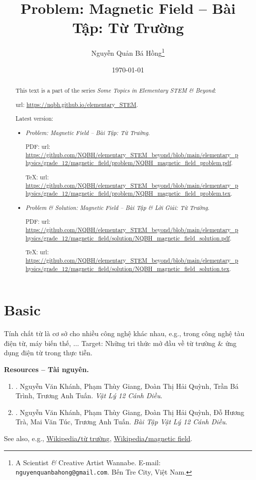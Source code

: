 \documentclass{article}
\title{Problem: Magnetic Field -- Bài Tập: Từ Trường}
\author{Nguyễn Quản Bá Hồng\footnote{A Scientist {\it\&} Creative Artist Wannabe. E-mail: {\tt nguyenquanbahong@gmail.com}. Bến Tre City, Việt Nam.}}
\date{\today}
\begin{document}
\maketitle
\begin{abstract}
	This text is a part of the series {\it Some Topics in Elementary STEM \& Beyond}:
	
	{\sc url}: \url{https://nqbh.github.io/elementary_STEM}.
	
	Latest version:
	\begin{itemize}
		\item {\it Problem: Magnetic Field -- Bài Tập: Từ Trường}.
		
		PDF: {\sc url}: \url{https://github.com/NQBH/elementary_STEM_beyond/blob/main/elementary_physics/grade_12/magnetic_field/problem/NQBH_magnetic_field_problem.pdf}.
		
		\TeX: {\sc url}: \url{https://github.com/NQBH/elementary_STEM_beyond/blob/main/elementary_physics/grade_12/magnetic_field/problem/NQBH_magnetic_field_problem.tex}.
		\item {\it Problem \& Solution: Magnetic Field -- Bài Tập \& Lời Giải: Từ Trường}.
		
		PDF: {\sc url}: \url{https://github.com/NQBH/elementary_STEM_beyond/blob/main/elementary_physics/grade_12/magnetic_field/solution/NQBH_magnetic_field_solution.pdf}.
		
		\TeX: {\sc url}: \url{https://github.com/NQBH/elementary_STEM_beyond/blob/main/elementary_physics/grade_12/magnetic_field/solution/NQBH_magnetic_field_solution.tex}.
	\end{itemize}
\end{abstract}
\tableofcontents


\section{Basic}
Tính chất từ là cơ sở cho nhiều công nghệ khác nhau, e.g., trong công nghệ tàu điện từ, máy biến thế, $\ldots$ Target: Những tri thức mở đầu về từ trường \& ứng dụng điện từ trong thực tiễn.

\noindent\textbf{\textsf{Resources -- Tài nguyên.}}
\begin{enumerate}
	\item \cite[Chủ đề 3: {\it Từ Trường}]{SGK_Vat_Ly_12_CD}. {\sc Nguyễn Văn Khánh, Phạm Thùy Giang, Đoàn Thị Hải Quỳnh, Trần Bá Trình, Trương Anh Tuấn}. {\it Vật Lý 12 Cánh Diều}.
	
	\item \cite[Chủ đề 3: {\it Từ Trường}]{SBT_Vat_Ly_12_CD}. {\sc Nguyễn Văn Khánh, Phạm Thùy Giang, Đoàn Thị Hải Quỳnh, Đỗ Hương Trà, Mai Văn Túc, Trương Anh Tuấn}. {\it Bài Tập Vật Lý 12 Cánh Diều}.
\end{enumerate}
See also, e.g., \href{https://vi.wikipedia.org/wiki/T%E1%BB%AB_tr%C6%B0%E1%BB%9Dng}{Wikipedia{\tt/}từ trường}, \href{https://en.wikipedia.org/wiki/Magnetic_field}{Wikipedia{\tt/}magnetic field}.
\end{document}

